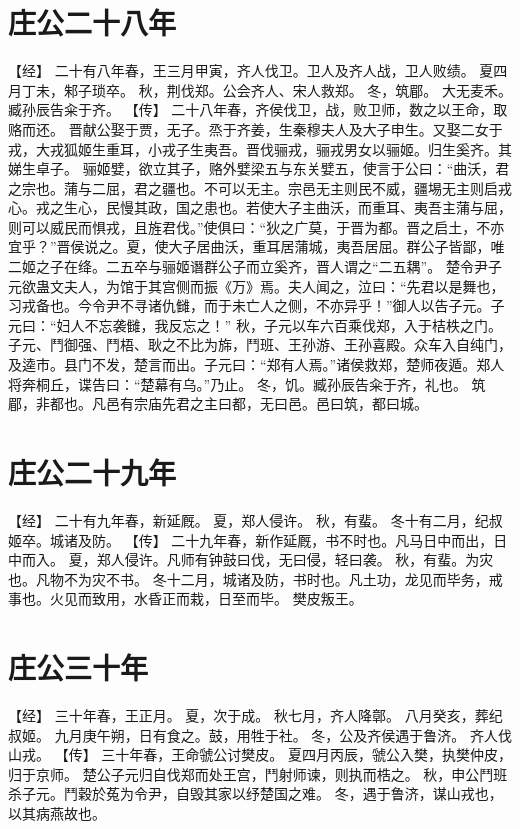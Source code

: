 \documentclass[a4paper,12pt,UTF8,twoside]{ctexbook}
\begin{document}
\chapter{庄公二十八年}

【经】
二十有八年春，王三月甲寅，齐人伐卫。卫人及齐人战，卫人败绩。
夏四月丁未，邾子琐卒。
秋，荆伐郑。公会齐人、宋人救郑。
冬，筑郿。
大无麦禾。臧孙辰告籴于齐。
【传】
二十八年春，齐侯伐卫，战，败卫师，数之以王命，取赂而还。
晋献公娶于贾，无子。烝于齐姜，生秦穆夫人及大子申生。又娶二女于戎，大戎狐姬生重耳，小戎子生夷吾。晋伐骊戎，骊戎男女以骊姬。归生奚齐。其娣生卓子。
骊姬嬖，欲立其子，赂外嬖梁五与东关嬖五，使言于公曰：“曲沃，君之宗也。蒲与二屈，君之疆也。不可以无主。宗邑无主则民不威，疆埸无主则启戎心。戎之生心，民慢其政，国之患也。若使大子主曲沃，而重耳、夷吾主蒲与屈，则可以威民而惧戎，且旌君伐。”使俱曰：“狄之广莫，于晋为都。晋之启土，不亦宜乎？”晋侯说之。夏，使大子居曲沃，重耳居蒲城，夷吾居屈。群公子皆鄙，唯二姬之子在绛。二五卒与骊姬谮群公子而立奚齐，晋人谓之“二五耦”。
楚令尹子元欲蛊文夫人，为馆于其宫侧而振《万》焉。夫人闻之，泣曰：“先君以是舞也，习戎备也。今令尹不寻诸仇雠，而于未亡人之侧，不亦异乎！”御人以告子元。子元曰：“妇人不忘袭雠，我反忘之！”
秋，子元以车六百乘伐郑，入于桔柣之门。子元、鬥御强、鬥梧、耿之不比为旆，鬥班、王孙游、王孙喜殿。众车入自纯门，及逵市。县门不发，楚言而出。子元曰：“郑有人焉。”诸侯救郑，楚师夜遁。郑人将奔桐丘，谍告曰：“楚幕有乌。”乃止。
冬，饥。臧孙辰告籴于齐，礼也。
筑郿，非都也。凡邑有宗庙先君之主曰都，无曰邑。邑曰筑，都曰城。

\chapter{庄公二十九年}

【经】
二十有九年春，新延厩。
夏，郑人侵许。
秋，有蜚。
冬十有二月，纪叔姬卒。城诸及防。
【传】
二十九年春，新作延厩，书不时也。凡马日中而出，日中而入。
夏，郑人侵许。凡师有钟鼓曰伐，无曰侵，轻曰袭。
秋，有蜚。为灾也。凡物不为灾不书。
冬十二月，城诸及防，书时也。凡土功，龙见而毕务，戒事也。火见而致用，水昏正而栽，日至而毕。
樊皮叛王。

\chapter{庄公三十年}

【经】
三十年春，王正月。
夏，次于成。
秋七月，齐人降鄣。
八月癸亥，葬纪叔姬。
九月庚午朔，日有食之。鼓，用牲于社。
冬，公及齐侯遇于鲁济。
齐人伐山戎。
【传】
三十年春，王命虢公讨樊皮。
夏四月丙辰，虢公入樊，执樊仲皮，归于京师。
楚公子元归自伐郑而处王宫，鬥射师谏，则执而梏之。
秋，申公鬥班杀子元。鬥穀於菟为令尹，自毁其家以纾楚国之难。
冬，遇于鲁济，谋山戎也，以其病燕故也。
\end{document}
